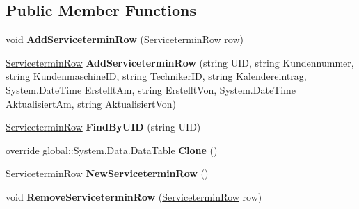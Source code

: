 \subsection*{Public Member Functions}
\begin{DoxyCompactItemize}
\item 
void {\bfseries Add\+Servicetermin\+Row} (\hyperlink{class_products_1_1_data_1_1ds_sage_1_1_servicetermin_row}{Servicetermin\+Row} row)\hypertarget{class_products_1_1_data_1_1ds_sage_1_1_servicetermin_data_table_aa8bd19288b75fcba26a4bbc0a5dd4ff8}{}\label{class_products_1_1_data_1_1ds_sage_1_1_servicetermin_data_table_aa8bd19288b75fcba26a4bbc0a5dd4ff8}

\item 
\hyperlink{class_products_1_1_data_1_1ds_sage_1_1_servicetermin_row}{Servicetermin\+Row} {\bfseries Add\+Servicetermin\+Row} (string U\+ID, string Kundennummer, string Kundenmaschine\+ID, string Techniker\+ID, string Kalendereintrag, System.\+Date\+Time Erstellt\+Am, string Erstellt\+Von, System.\+Date\+Time Aktualisiert\+Am, string Aktualisiert\+Von)\hypertarget{class_products_1_1_data_1_1ds_sage_1_1_servicetermin_data_table_acb6970685207b2c00fbf494d8ad88d7c}{}\label{class_products_1_1_data_1_1ds_sage_1_1_servicetermin_data_table_acb6970685207b2c00fbf494d8ad88d7c}

\item 
\hyperlink{class_products_1_1_data_1_1ds_sage_1_1_servicetermin_row}{Servicetermin\+Row} {\bfseries Find\+By\+U\+ID} (string U\+ID)\hypertarget{class_products_1_1_data_1_1ds_sage_1_1_servicetermin_data_table_a0211bdbccd4db7a74dca995507cb992a}{}\label{class_products_1_1_data_1_1ds_sage_1_1_servicetermin_data_table_a0211bdbccd4db7a74dca995507cb992a}

\item 
override global\+::\+System.\+Data.\+Data\+Table {\bfseries Clone} ()\hypertarget{class_products_1_1_data_1_1ds_sage_1_1_servicetermin_data_table_afbdf31cefadd4eafbfaa3f883addca44}{}\label{class_products_1_1_data_1_1ds_sage_1_1_servicetermin_data_table_afbdf31cefadd4eafbfaa3f883addca44}

\item 
\hyperlink{class_products_1_1_data_1_1ds_sage_1_1_servicetermin_row}{Servicetermin\+Row} {\bfseries New\+Servicetermin\+Row} ()\hypertarget{class_products_1_1_data_1_1ds_sage_1_1_servicetermin_data_table_ae49636cbde205918ce641c1e06a4a5be}{}\label{class_products_1_1_data_1_1ds_sage_1_1_servicetermin_data_table_ae49636cbde205918ce641c1e06a4a5be}

\item 
void {\bfseries Remove\+Servicetermin\+Row} (\hyperlink{class_products_1_1_data_1_1ds_sage_1_1_servicetermin_row}{Servicetermin\+Row} row)\hypertarget{class_products_1_1_data_1_1ds_sage_1_1_servicetermin_data_table_a0bfc9c36f5c54fa3b0b8490c47b835fe}{}\label{class_products_1_1_data_1_1ds_sage_1_1_servicetermin_data_table_a0bfc9c36f5c54fa3b0b8490c47b835fe}

\end{DoxyCompactItemize}
